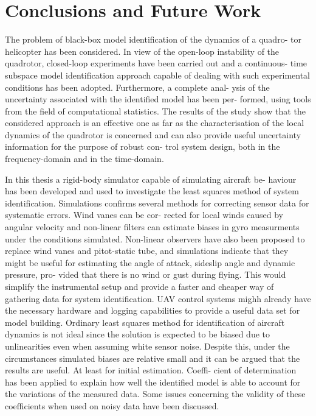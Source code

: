 \chapter{Conclusions and Future Work}


The problem of black-box model identification of the dynamics of a quadro- tor helicopter has been considered. In view of the open-loop instability of the quadrotor, closed-loop experiments have been carried out and a continuous- time subspace model identification approach capable of dealing with such experimental conditions has been adopted. Furthermore, a complete anal- ysis of the uncertainty associated with the identified model has been per- formed, using tools from the field of computational statistics. The results of the study show that the considered approach is an effective one as far as the characterisation of the local dynamics of the quadrotor is concerned and can also provide useful uncertainty information for the purpose of robust con- trol system design, both in the frequency-domain and in the time-domain.


In this thesis a rigid-body simulator capable of simulating aircraft be- haviour has been developed and used to investigate the least squares method of system identification. Simulations confirms several methods for correcting sensor data for systematic errors. Wind vanes can be cor- rected for local winds caused by angular velocity and non-linear filters can estimate biases in gyro measurments under the conditions simulated. Non-linear observers have also been proposed to replace wind vanes and pitot-static tube, and simulations indicate that they might be useful for estimating the angle of attack, sideslip angle and dynamic pressure, pro- vided that there is no wind or gust during flying. This would simplify the instrumental setup and provide a faster and cheaper way of gathering data for system identification. UAV control systems mighh already have the necessary hardware and logging capabilities to provide a useful data set for model building. Ordinary least squares method for identification of aircraft dynamics is not ideal since the solution is expected to be biased due to unlinearities even when assuming white sensor noise. Despite this, under the circumstances simulated biases are relative small and it can be argued that the results are useful. At least for initial estimation. Coeffi- cient of determination has been applied to explain how well the identified model is able to account for the variations of the measured data. Some issues concerning the validity of these coefficients when used on noisy data have been discussed.

